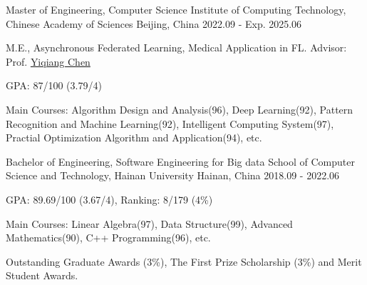 

\begin{cventries}

\cventry
{Master of Engineering, Computer Science} %
{Institute of Computing Technology, Chinese Academy of Sciences} %
{Beijing, China} %
{2022.09 - Exp. 2025.06} %
{
  \begin{cvitems} %
    \item {M.E., Asynchronous Federated Learning, Medical Application in FL. Advisor: Prof. \href{https://www.ict.cas.cn/sourcedb_ict_cas/cn/jssrck/200909/t20090917_2496596.html}{Yiqiang Chen}}
    \item {GPA: 87/100 (3.79/4)}
    \item {Main Courses: Algorithm Design and Analysis(96), Deep Learning(92), Pattern Recognition and Machine Learning(92), Intelligent Computing System(97), Practial Optimization Algorithm and Application(94), etc.}
  \end{cvitems}
}

\cventry
{Bachelor of Engineering, Software Engineering for Big data} %
{School of Computer Science and Technology, Hainan University} %
{Hainan, China} %
{2018.09 - 2022.06} %
{
  \begin{cvitems} %
    \item {GPA: 89.69/100 (3.67/4), Ranking: 8/179 (4\%)} %
    \item {Main Courses: Linear Algebra(97), Data Structure(99), Advanced Mathematics(90), C++ Programming(96), etc.}
    \item {Outstanding Graduate Awards (3\%), The First Prize Scholarship (3\%) and Merit Student Awards.}
  \end{cvitems}
}

\end{cventries}

